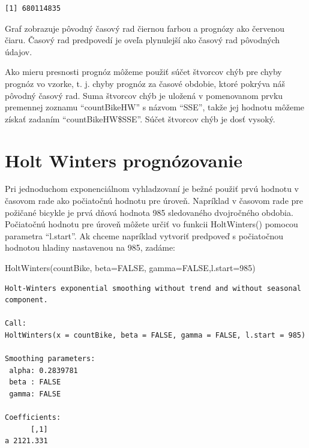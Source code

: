 \documentclass[
  letterpaper,
  DIV=11,
  numbers=noendperiod]{scrreprt}
\newenvironment{Shaded}{\begin{snugshade}}{\end{snugshade}}
\newcommand{\AttributeTok}[1]{\textcolor[rgb]{0.40,0.45,0.13}{#1}}
\newcommand{\ConstantTok}[1]{\textcolor[rgb]{0.56,0.35,0.01}{#1}}
\newcommand{\DecValTok}[1]{\textcolor[rgb]{0.68,0.00,0.00}{#1}}
\newcommand{\FunctionTok}[1]{\textcolor[rgb]{0.28,0.35,0.67}{#1}}
\newcommand{\NormalTok}[1]{\textcolor[rgb]{0.00,0.23,0.31}{#1}}
\newcommand{\SpecialCharTok}[1]{\textcolor[rgb]{0.37,0.37,0.37}{#1}}
\begin{document}
\begin{Shaded}
\end{Shaded}

\begin{verbatim}
[1] 680114835
\end{verbatim}

Graf zobrazuje pôvodný časový rad čiernou farbou a prognózy ako červenou
čiaru. Časový rad predpovedí je oveľa plynulejší ako časový rad
pôvodných údajov.

Ako mieru presnosti prognóz môžeme použiť súčet štvorcov chýb pre chyby
prognóz vo vzorke, t. j. chyby prognóz za časové obdobie, ktoré pokrýva
náš pôvodný časový rad. Suma štvorcov chýb je uložená v pomenovanom
prvku premennej zoznamu ``countBikeHW'' s názvom ``SSE'', takže jej
hodnotu môžeme získať zadaním ``countBikeHW\$SSE''. Súčet štvorcov chýb
je dosť vysoký.

\section{Holt Winters
prognózovanie}\label{holt-winters-prognuxf3zovanie}

Pri jednoduchom exponenciálnom vyhladzovaní je bežné použiť prvú hodnotu
v časovom rade ako počiatočnú hodnotu pre úroveň. Napríklad v časovom
rade pre požičané bicykle je prvá dňová hodnota 985 sledovaného
dvojročného obdobia. Počiatočnú hodnotu pre úroveň môžete určiť vo
funkcii HoltWinters() pomocou parametra ``l.start''. Ak chceme napríklad
vytvoriť predpoveď s počiatočnou hodnotou hladiny nastavenou na 985,
zadáme:

\begin{Shaded}
\begin{Highlighting}[]
\FunctionTok{HoltWinters}\NormalTok{(countBike, }\AttributeTok{beta=}\ConstantTok{FALSE}\NormalTok{, }\AttributeTok{gamma=}\ConstantTok{FALSE}\NormalTok{,}\AttributeTok{l.start=}\DecValTok{985}\NormalTok{)}
\end{Highlighting}
\end{Shaded}

\begin{verbatim}
Holt-Winters exponential smoothing without trend and without seasonal component.

Call:
HoltWinters(x = countBike, beta = FALSE, gamma = FALSE, l.start = 985)

Smoothing parameters:
 alpha: 0.2839781
 beta : FALSE
 gamma: FALSE

Coefficients:
      [,1]
a 2121.331
\end{verbatim}
\end{document}
